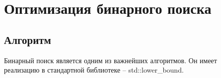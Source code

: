 \section{Оптимизация бинарного поиска}

\subsection{Алгоритм}
Бинарный поиск является одним из важнейших алгоритмов. Он имеет реализацию в стандартной библиотеке -- std::lower\_bound. 
